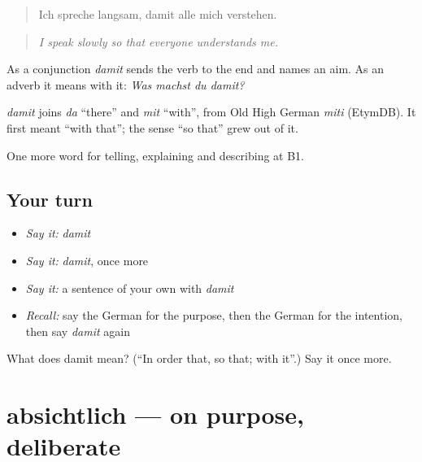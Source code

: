 \begin{quote}
Ich spreche langsam, damit alle mich verstehen.
\end{quote}

\begin{quote}
\emph{I speak slowly so that everyone understands me.}
\end{quote}

As a conjunction \emph{damit} sends the verb to the end and names an aim. As an adverb it means with it: \emph{Was machst du damit?}

\begin{cousinweb}
\emph{damit} joins \emph{da} \textquotedblleft{}there\textquotedblright{} and \emph{mit} \textquotedblleft{}with\textquotedblright{}, from Old High German \emph{miti} (EtymDB). It first meant \textquotedblleft{}with that\textquotedblright{}; the sense \textquotedblleft{}so that\textquotedblright{} grew out of it.
\end{cousinweb}

\begin{grammarlens}[title={What you've built}]
One more word for telling, explaining and describing at B1.
\end{grammarlens}

\subsection*{Your turn}
\begin{itemize}
\raggedright
  \item \emph{Say it:} \emph{damit}
  \item \emph{Say it:} \emph{damit}, once more
  \item \emph{Say it:} a sentence of your own with \emph{damit}
  \item \emph{Recall:} say the German for the purpose, then the German for the intention, then say \emph{damit} again
\end{itemize}

\begin{tcolorbox}[breakable,colback=teal!4,colframe=teal!35!black,title={Before you move on}]
What does damit mean? (\textquotedblleft{}In order that, so that; with it\textquotedblright{}.) Say it once more.
\end{tcolorbox}
\section[absichtlich]{absichtlich — on purpose, deliberate}

